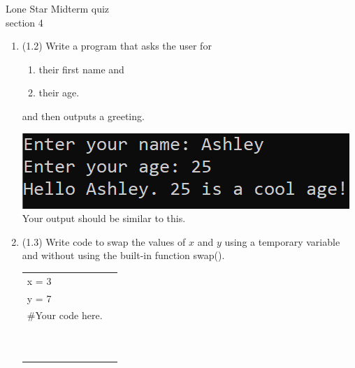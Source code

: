 \documentclass{article}
\begin{document}

Lone Star \hfill Midterm quiz\\
section 4\\
\begin{enumerate}
\item (1.2) Write a program that asks the user for \\
		\begin{minipage}{0.5\textwidth}
		\vspace*{-0.5em}
			\begin{enumerate}  \setlength\itemsep{-0.3em}
				\item their first name and
				\item their age.  
			\end{enumerate} \vspace*{-1ex}
		and then outputs a greeting.
		\end{minipage}
		\begin{minipage}{0.5\textwidth}
			\centering
			\includegraphics[scale=0.95]{./imgs/outputGreetingWithAge.png}\\
			Your output should be similar to this.
		\end{minipage}




\item (1.3) 
		Write code to swap the values of $x$ and $y$ using a temporary variable and without using
		the built-in function swap().\\		
		\begin{tabular}{|ll}
			\\			
			x = 3\\
			y = 7\\[5pt]
			\#Your code here. \\[5pt]
			& \\ & \\ & \\ & \\ & \\ & \\ & \\ & \\ & \\ & \\ 
		\end{tabular}



\end{enumerate}
\end{document}
